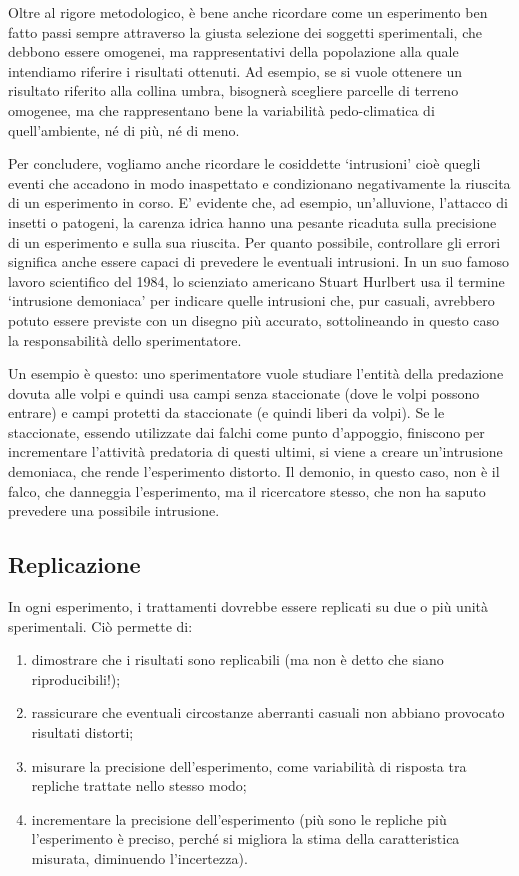 \documentclass[a4paper,12pt,oneside]{book}
\providecommand{\tightlist}{%
  \setlength{\itemsep}{0pt}\setlength{\parskip}{0pt}}
\begin{document}
Oltre al rigore metodologico, è bene anche ricordare come un esperimento ben fatto passi sempre attraverso la giusta selezione dei soggetti sperimentali, che debbono essere omogenei, ma rappresentativi della popolazione alla quale intendiamo riferire i risultati ottenuti. Ad esempio, se si vuole ottenere un risultato riferito alla collina umbra, bisognerà scegliere parcelle di terreno omogenee, ma che rappresentano bene la variabilità pedo-climatica di quell'ambiente, né di più, né di meno.

Per concludere, vogliamo anche ricordare le cosiddette `intrusioni' cioè quegli eventi che accadono in modo inaspettato e condizionano negativamente la riuscita di un esperimento in corso. E' evidente che, ad esempio, un'alluvione, l'attacco di insetti o patogeni, la carenza idrica hanno una pesante ricaduta sulla precisione di un esperimento e sulla sua riuscita. Per quanto possibile, controllare gli errori significa anche essere capaci di prevedere le eventuali intrusioni. In un suo famoso lavoro scientifico del 1984, lo scienziato americano Stuart Hurlbert usa il termine `intrusione demoniaca' per indicare quelle intrusioni che, pur casuali, avrebbero potuto essere previste con un disegno più accurato, sottolineando in questo caso la responsabilità dello sperimentatore.

Un esempio è questo: uno sperimentatore vuole studiare l'entità della predazione dovuta alle volpi e quindi usa campi senza staccionate (dove le volpi possono entrare) e campi protetti da staccionate (e quindi liberi da volpi). Se le staccionate, essendo utilizzate dai falchi come punto d'appoggio, finiscono per incrementare l'attività predatoria di questi ultimi, si viene a creare un'intrusione demoniaca, che rende l'esperimento distorto. Il demonio, in questo caso, non è il falco, che danneggia l'esperimento, ma il ricercatore stesso, che non ha saputo prevedere una possibile intrusione.

\hypertarget{replicazione}{%
\subsection{Replicazione}\label{replicazione}}

In ogni esperimento, i trattamenti dovrebbe essere replicati su due o più unità sperimentali. Ciò permette di:

\begin{enumerate}
\def\labelenumi{\arabic{enumi}.}
\tightlist
\item
  dimostrare che i risultati sono replicabili (ma non è detto che siano riproducibili!);
\item
  rassicurare che eventuali circostanze aberranti casuali non abbiano provocato risultati distorti;
\item
  misurare la precisione dell'esperimento, come variabilità di risposta tra repliche trattate nello stesso modo;
\item
  incrementare la precisione dell'esperimento (più sono le repliche più l'esperimento è preciso, perché si migliora la stima della caratteristica misurata, diminuendo l'incertezza).
\end{enumerate}
\end{document}
